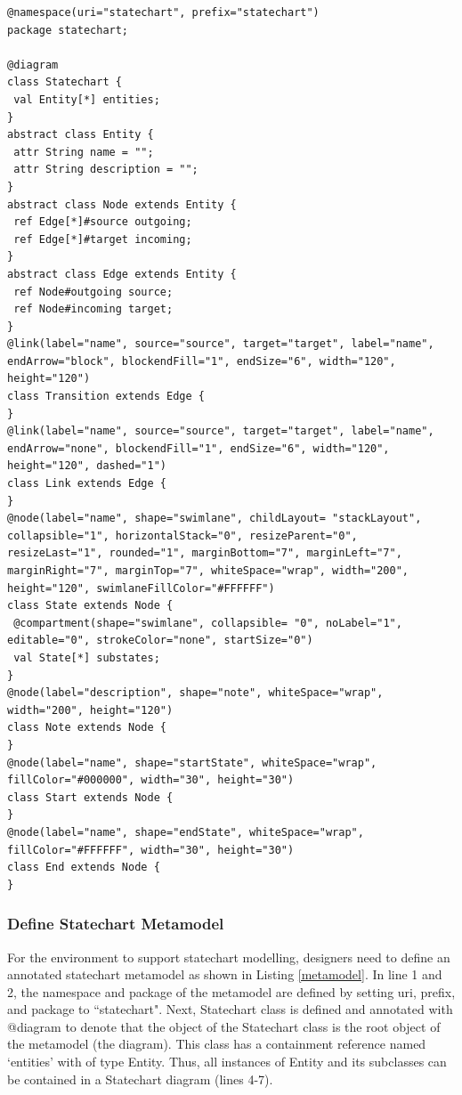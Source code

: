 \documentclass[12pt, a4paper]{report} \usepackage[titletoc]{appendix}
\begin{document}
\begin{lstlisting}[style=interfaces,caption={A definition of statechart diagram using Emfatic and Eugenia-like annotations.},label=metamodel]
@namespace(uri="statechart", prefix="statechart")
package statechart;

@diagram
class Statechart {
 val Entity[*] entities;
}
abstract class Entity {
 attr String name = "";
 attr String description = "";
}
abstract class Node extends Entity {
 ref Edge[*]#source outgoing;
 ref Edge[*]#target incoming;
}
abstract class Edge extends Entity {
 ref Node#outgoing source;
 ref Node#incoming target;
}
@link(label="name", source="source", target="target", label="name", endArrow="block", blockendFill="1", endSize="6", width="120", height="120")
class Transition extends Edge {
}
@link(label="name", source="source", target="target", label="name", endArrow="none", blockendFill="1", endSize="6", width="120", height="120", dashed="1")
class Link extends Edge {
}
@node(label="name", shape="swimlane", childLayout= "stackLayout", collapsible="1", horizontalStack="0", resizeParent="0", resizeLast="1", rounded="1", marginBottom="7", marginLeft="7", marginRight="7", marginTop="7", whiteSpace="wrap", width="200", height="120", swimlaneFillColor="#FFFFFF")
class State extends Node {
 @compartment(shape="swimlane", collapsible= "0", noLabel="1", editable="0", strokeColor="none", startSize="0")
 val State[*] substates;
}
@node(label="description", shape="note", whiteSpace="wrap", width="200", height="120")
class Note extends Node {
}
@node(label="name", shape="startState", whiteSpace="wrap", fillColor="#000000", width="30", height="30")
class Start extends Node {
}
@node(label="name", shape="endState", whiteSpace="wrap", fillColor="#FFFFFF", width="30", height="30")
class End extends Node {
}
\end{lstlisting} 

\subsubsection{Define Statechart Metamodel}
For the environment to support statechart modelling, designers need to define an annotated statechart metamodel as shown in Listing \ref{metamodel}. In line 1 and 2, the namespace and package of the metamodel are defined by setting uri, prefix, and package to ``statechart". Next, Statechart class is defined and annotated with {\selectfont @diagram} to denote that the object of the Statechart class is the root object of the metamodel (the diagram). This class has a containment reference named `entities' with of type Entity. Thus, all instances of Entity and its subclasses can be contained in a Statechart diagram (lines 4-7). 
\end{document}
